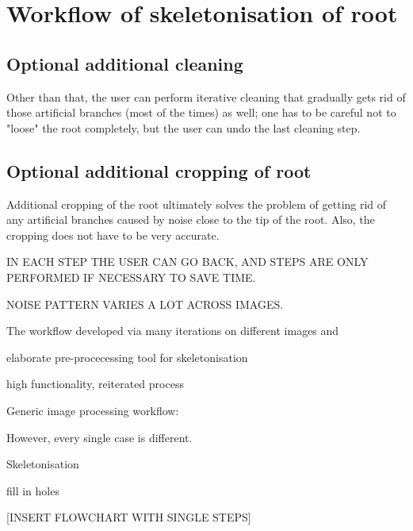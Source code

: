  

\section{Workflow of skeletonisation of root}

\subsection{Optional additional cleaning}

Other than that, the user can perform iterative cleaning that gradually gets rid of those artificial branches (most of the times) as well; one has to be careful not to "loose" the root completely, but the user can undo the last cleaning step. 

\subsection{Optional additional cropping of root}

Additional cropping of the root ultimately solves the problem of getting rid of any artificial branches caused by noise close to the tip of the root.
Also, the cropping does not have to be very accurate.


IN EACH STEP THE USER CAN GO BACK, AND STEPS ARE ONLY PERFORMED IF NECESSARY TO SAVE TIME.


NOISE PATTERN VARIES A LOT ACROSS IMAGES.


The workflow developed via  many iterations on different images and 

elaborate pre-procecessing tool for skeletonisation

high functionality, reiterated process



Generic image processing workflow:

However, every single case is different. 

Skeletonisation

fill in holes


[INSERT FLOWCHART WITH SINGLE STEPS]

